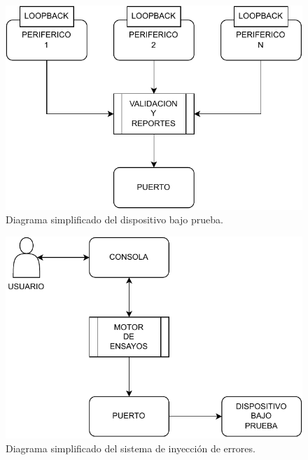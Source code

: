 \begin{figure}[htbp]
	\centering
	\includegraphics[width=.8\textwidth]{./Figures/dutsimple.pdf}
    \caption{Diagrama simplificado del dispositivo bajo prueba.}
	\label{fig:dutsimple}
\end{figure}

\begin{figure}[htbp]
	\centering
	\includegraphics[width=.8\textwidth]{./Figures/sisesimple.pdf}
    \caption{Diagrama simplificado del sistema de inyección de errores.}
	\label{fig:sisesimple}
\end{figure}

\label{sec:alcance}
